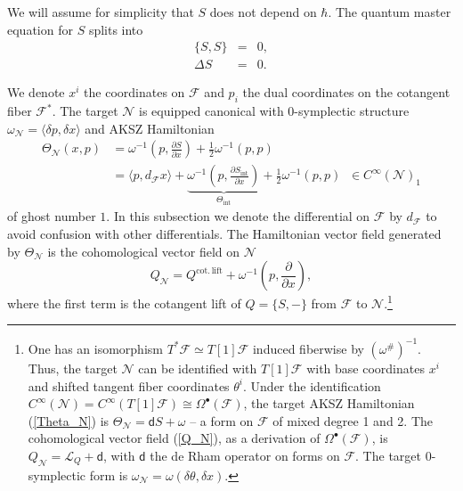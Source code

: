 \documentclass{amsart}
\theoremstyle{plain} %
\theoremstyle{definition}
\theoremstyle{remark}
\newcommand{\mc}{\mathcal}
\newcommand{\mr}{\mathrm}
\newcommand{\bt}{\bullet}
\newcommand{\wh}{\widehat}
\newcommand{\F}{\mathcal{F}}
\newcommand{\LL}{\mathcal{L}}
\newcommand{\dd}{\partial}
\newcommand{\ii}{\mathrm{int}}
\newcommand{\formal}{\mathrm{formal}}
\newcommand{\N}{\mathcal{N}}
\begin{document}
We will assume for simplicity that $S$ does not depend on $\hbar$. The quantum master equation for $S$ splits into
\begin{eqnarray}
    \{S,S\} &=& 0,\\
    \Delta S &=& 0. \label{Delta S=0}
\end{eqnarray}

We denote $x^i$ the coordinates on $\F$ and $p_i$ the dual coordinates on the cotangent fiber $\F^*$. The target $\N$ is equipped canonical with $0$-symplectic structure $\omega_\N=\langle \delta p,\delta x \rangle$ and AKSZ Hamiltonian
\begin{equation}\label{Theta_N}
\begin{aligned}
    \Theta_\N(x,p)&=\omega^{-1}\left(p,\frac{\dd S}{\dd x}\right) + \frac12 \omega^{-1}(p,p) \\
    &= \langle p, d_\F x \rangle+\underbrace{\omega^{-1}\left(p,\frac{\dd S_\ii}{\dd x}\right)}_{\Theta_\ii} + \frac12 \omega^{-1}(p,p)\;\; \in C^\infty(\N)_1
\end{aligned}
\end{equation}
of ghost number $1$.
In this subsection we denote the differential on $\F$ by $d_\F$ to avoid confusion with other differentials. The Hamiltonian vector field generated by $\Theta_\N$ is the cohomological vector field on $\N$
\begin{equation}\label{Q_N}
    Q_\N=Q^\mr{cot.\,lift}+\omega^{-1}\left(p,\frac{\dd}{\dd x}\right),
\end{equation}
where the first term is the cotangent lift of $Q=\{S,-\}$ from $\F$ to $\N$.\footnote{
One has an isomorphism $T^*\F\simeq T[1]\F$ induced fiberwise by $(\omega^\#)^{-1}$. Thus, the target $\N$ can be identified with $T[1]\F$ with base coordinates $x^i$ and shifted tangent fiber coordinates $\theta^i$. 
Under the identification $C^\infty(\N)=C^\infty(T[1]\F)\cong \Omega^\bt(\F)$, the target AKSZ Hamiltonian (\ref{Theta_N}) is $\Theta_\mc{N}=\mathsf{d}S+\omega$ -- a form on $\F$ of mixed degree 1 and 2. The cohomological vector field (\ref{Q_N}), as a derivation of $\Omega^\bt(\F)$, is $Q_\mc{N}=\LL_Q+\mathsf{d}$, with $\mathsf{d}$ the de Rham operator on forms on $\F$. The target $0$-symplectic form is $\omega_\N=\omega(\delta\theta,\delta x)$.
}
\end{document}
